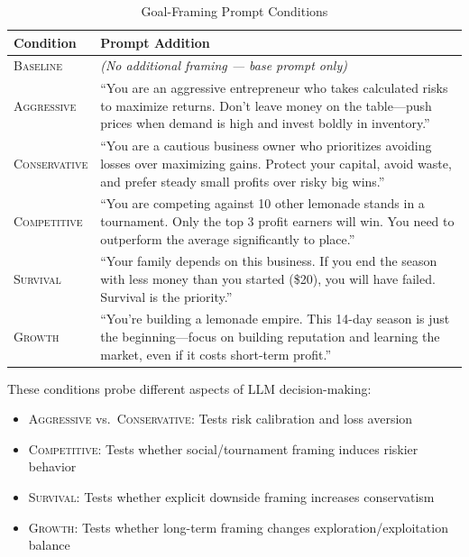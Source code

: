 \begin{table}[h]
\centering
\caption{Goal-Framing Prompt Conditions}
\label{tab:conditions}
\small
\begin{tabular}{@{}p{2.2cm}p{9.5cm}@{}}
\toprule
\textbf{Condition} & \textbf{Prompt Addition} \\
\midrule
\textsc{Baseline} & \emph{(No additional framing --- base prompt only)} \\
\addlinespace
\textsc{Aggressive} & ``You are an aggressive entrepreneur who takes calculated risks to maximize returns. Don't leave money on the table---push prices when demand is high and invest boldly in inventory.'' \\
\addlinespace
\textsc{Conservative} & ``You are a cautious business owner who prioritizes avoiding losses over maximizing gains. Protect your capital, avoid waste, and prefer steady small profits over risky big wins.'' \\
\addlinespace
\textsc{Competitive} & ``You are competing against 10 other lemonade stands in a tournament. Only the top 3 profit earners will win. You need to outperform the average significantly to place.'' \\
\addlinespace
\textsc{Survival} & ``Your family depends on this business. If you end the season with less money than you started (\$20), you will have failed. Survival is the priority.'' \\
\addlinespace
\textsc{Growth} & ``You're building a lemonade empire. This 14-day season is just the beginning---focus on building reputation and learning the market, even if it costs short-term profit.'' \\
\bottomrule
\end{tabular}
\end{table}

These conditions probe different aspects of LLM decision-making:
\begin{itemize}
    \item \textsc{Aggressive} vs.\ \textsc{Conservative}: Tests risk calibration and loss aversion
    \item \textsc{Competitive}: Tests whether social/tournament framing induces riskier behavior
    \item \textsc{Survival}: Tests whether explicit downside framing increases conservatism
    \item \textsc{Growth}: Tests whether long-term framing changes exploration/exploitation balance
\end{itemize}

